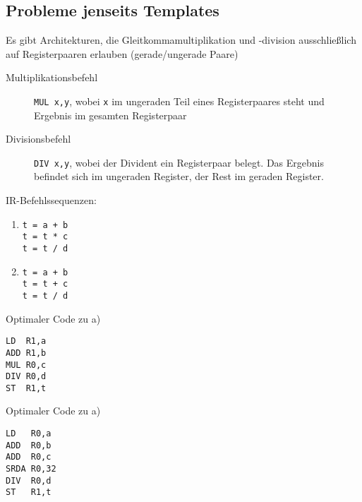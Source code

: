 \subsection{Probleme jenseits Templates}
\Bsp Es gibt Architekturen, die Gleitkommamultiplikation und -division ausschließlich auf Registerpaaren erlauben (gerade/ungerade Paare)
\begin{description}
 \item[Multiplikationsbefehl] \texttt{MUL x,y}, wobei \texttt{x} im ungeraden Teil eines Registerpaares steht und Ergebnis im gesamten Registerpaar
 \item[Divisionsbefehl] \texttt{DIV x,y}, wobei der Divident ein Registerpaar belegt. Das Ergebnis befindet sich im ungeraden Register, der Rest im geraden Register.
\end{description}
IR-Befehlssequenzen:
\renewcommand{\theenumi}{\alph{enumi}}
\renewcommand{\labelenumi}{\theenumi)}
\begin{enumerate}
 \item \begin{verbatim}
t = a + b
t = t * c
t = t / d
       \end{verbatim}
 \item \begin{verbatim}
t = a + b
t = t + c
t = t / d
       \end{verbatim}
\end{enumerate}
Optimaler Code zu a)
\begin{verbatim}
LD  R1,a
ADD R1,b
MUL R0,c
DIV R0,d
ST  R1,t
\end{verbatim}
Optimaler Code zu a)
\begin{verbatim}
LD   R0,a
ADD  R0,b
ADD  R0,c
SRDA R0,32
DIV  R0,d
ST   R1,t
\end{verbatim}

